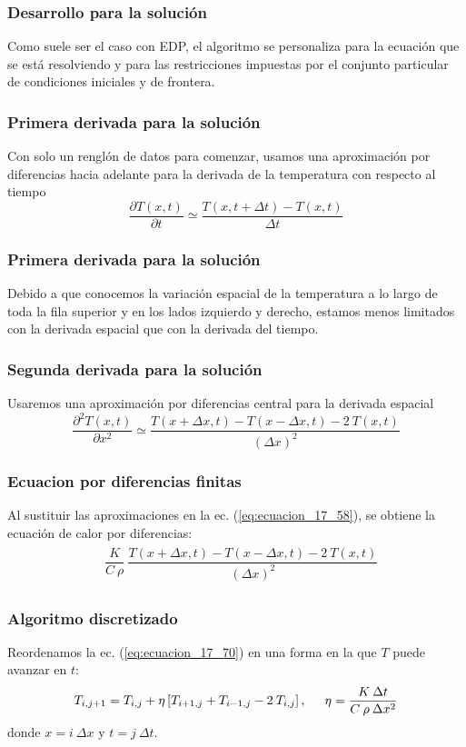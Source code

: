 \documentclass[12pt]{beamer}
\begin{document}
\begin{frame}
\frametitle{Desarrollo para la solución}
Como suele ser el caso con EDP, el algoritmo se personaliza para la ecuación que se está resolviendo y para las restricciones impuestas por el conjunto particular de condiciones iniciales y de frontera.
\end{frame}
\begin{frame}
\frametitle{Primera derivada para la solución}
Con solo un renglón de datos para comenzar, usamos una aproximación por diferencias hacia adelante para la derivada de la temperatura con respecto al tiempo
\begin{equation}
\dfrac{\partial T(x,t)}{\partial t} \simeq \dfrac{T(x, t + \Delta t) - T(x, t)}{\Delta t}
\label{eq:ecuacion_17_68}
\end{equation}
\end{frame}
\begin{frame}
\frametitle{Primera derivada para la solución}
Debido a que conocemos la variación espacial de la temperatura a lo largo de toda la fila superior y en los lados izquierdo y derecho, estamos menos limitados con la derivada espacial que con la derivada del tiempo.
\end{frame}
\begin{frame}
\frametitle{Segunda derivada para la solución}
Usaremos una aproximación por diferencias central para la derivada espacial
\begin{equation}
\dfrac{\partial^{2} T(x,t)}{\partial x^{2}} \simeq \dfrac{T(x + \Delta x, t ) - T(x - \Delta x, t) - 2 \: T(x,t)}{(\Delta x)^{2}}
\label{eq:ecuacion_17_69}
\end{equation}
\end{frame}
\begin{frame}
\frametitle{Ecuacion por diferencias finitas}
Al sustituir las aproximaciones en la ec. (\ref{eq:ecuacion_17_58}), se obtiene la ecuación de calor por diferencias:
\begin{align}
\begin{aligned}
& \dfrac{K}{C \: \rho} \: \dfrac{T(x + \Delta x, t) - T(x - \Delta x, t) - 2 \: T(x,t)}{(\Delta x)^{2}}
\end{aligned}
\label{eq:ecuacion_17_70}
\end{align}
\end{frame}
\begin{frame}
\frametitle{Algoritmo discretizado}
Reordenamos la ec. (\ref{eq:ecuacion_17_70}) en una forma en la que $T$ puede avanzar en $t$:
\begin{equation}
T_{i, j+1} = T_{i, j} + \eta \left[ T_{i+1, j} + T_{i-1, j} - 2 \: T_{i, j} \right], \hspace{0.5cm} \eta = \dfrac{K \: \Delta t}{C \: \rho \: \Delta x^{2}}
\label{eq:ecuacion_17_71}
\end{equation}
donde $x = i \: \Delta x $ y $t = j \: \Delta t$.
\end{frame}
\end{document}
